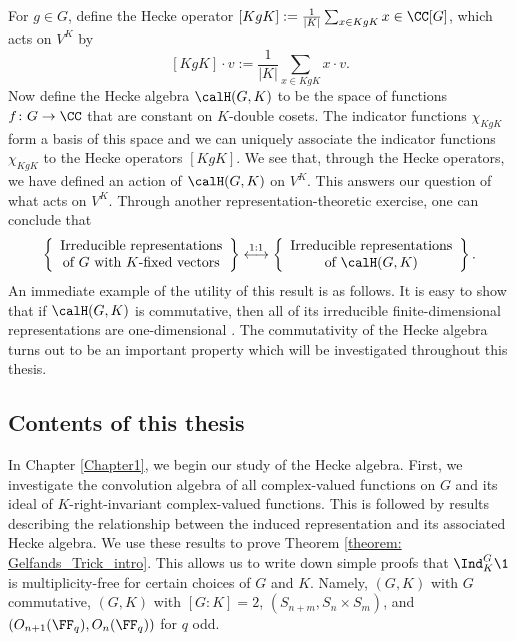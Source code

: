 For $g\in G$, define the Hecke operator $[KgK] := \frac{1}{|K|}\sum_{x\in KgK} x\in\CC[G]$, which acts on $V^K$ by
\[
	[KgK]\cdot v := \frac{1}{|K|}\sum_{x\in KgK} x\cdot v.
\]
Now define the Hecke algebra $\calH(G,K)$ to be the space of functions $f\colon G\to\CC$ that are constant on $K$-double cosets.
The indicator functions $\chi_{KgK}$ form a basis of this space and we can uniquely associate the indicator functions $\chi_{KgK}$ to the Hecke operators $[KgK]$.
We see that, through the Hecke operators, we have defined an action of $\calH(G,K)$ on $V^K$.
This answers our question of what acts on $V^K$.
Through another representation-theoretic exercise, one can conclude that
\[
	\left\{\begin{array}{c}
		\text{Irreducible representations} \\
		\text{of $G$ with $K$-fixed vectors}
	\end{array}\right\}
	\stackrel{1:1}{\longleftrightarrow}
	\left\{\begin{array}{c}
		\text{Irreducible representations} \\
		\text{of $\calH(G,K)$}
	\end{array}\right\}.
\]
An immediate example of the utility of this result is as follows. It is easy to show that if $\calH(G,K)$ is commutative, then all of its irreducible finite-dimensional representations are one-dimensional \cite{Etingof11}.
The commutativity of the Hecke algebra turns out to be an important property which will be investigated throughout this thesis.


\subsection*{Contents of this thesis}
In Chapter \ref{Chapter1}, we begin our study of the Hecke algebra.
First, we investigate the convolution algebra of all complex-valued functions on $G$ and its ideal of $K$-right-invariant complex-valued functions.
This is followed by results describing the relationship between the induced representation and its associated Hecke algebra.
We use these results to prove Theorem \ref{theorem: Gelfands_Trick_intro}.
This allows us to write down simple proofs that $\Ind_K^G \1$ is multiplicity-free for certain choices of $G$ and $K$.
Namely, $(G,K)$ with $G$ commutative, $(G,K)$ with $[G\! :\! K]=2$, $(S_{n+m}, S_n\times S_m)$, and $(O_{n+1}(\FF_q), O_n(\FF_q))$ for $q$ odd.

